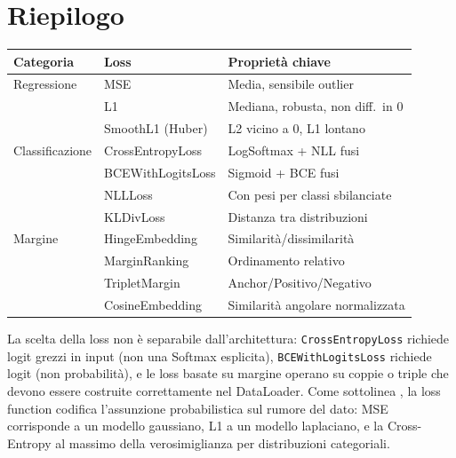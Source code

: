 \section{Riepilogo}
\label{sec:summary-ch4}

\begin{center}
\small
\begin{tabular}{lll}
  \toprule
  \textbf{Categoria} & \textbf{Loss} & \textbf{Proprietà chiave} \\
  \midrule
  Regressione   & MSE               & Media, sensibile outlier \\
                & L1                & Mediana, robusta, non diff.\ in 0 \\
                & SmoothL1 (Huber)  & L2 vicino a 0, L1 lontano \\
  \midrule
  Classificazione & CrossEntropyLoss & LogSoftmax + NLL fusi \\
                  & BCEWithLogitsLoss & Sigmoid + BCE fusi \\
                  & NLLLoss           & Con pesi per classi sbilanciate \\
                  & KLDivLoss         & Distanza tra distribuzioni \\
  \midrule
  Margine       & HingeEmbedding    & Similarità/dissimilarità \\
                & MarginRanking     & Ordinamento relativo \\
                & TripletMargin     & Anchor/Positivo/Negativo \\
                & CosineEmbedding   & Similarità angolare normalizzata \\
  \bottomrule
\end{tabular}
\end{center}

La scelta della loss non è separabile dall'architettura: \texttt{CrossEntropyLoss}
richiede logit grezzi in input (non una Softmax esplicita), \texttt{BCEWithLogitsLoss}
richiede logit (non probabilità), e le loss basate su margine operano su coppie o
triple che devono essere costruite correttamente nel DataLoader.
Come sottolinea \citet{bishop2024}, la loss function codifica l'assunzione
probabilistica sul rumore del dato: MSE corrisponde a un modello gaussiano,
L1 a un modello laplaciano, e la Cross-Entropy al massimo della
verosimiglianza per distribuzioni categoriali.
